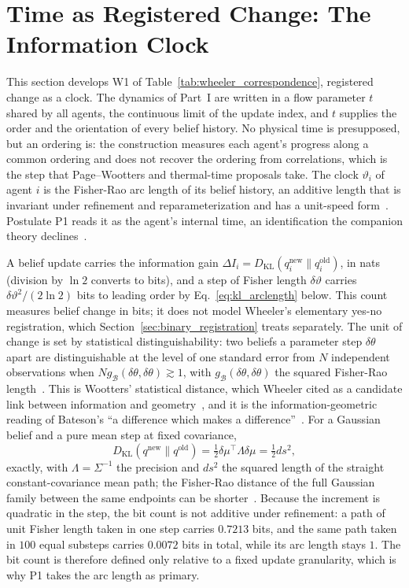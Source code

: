 \documentclass[11pt]{article}
\begin{document}
\section{Time as Registered Change: The Information Clock}\label{sec:time_info}

This section develops W1 of Table~\ref{tab:wheeler_correspondence}, registered change as a clock. The dynamics of Part~I are written in a flow parameter $t$ shared by all agents, the continuous limit of the update index, and $t$ supplies the order and the orientation of every belief history. No physical time is presupposed, but an ordering is: the construction measures each agent's progress along a common ordering and does not recover the ordering from correlations, which is the step that Page--Wootters and thermal-time proposals take. The clock $\vartheta_i$ of agent $i$ is the Fisher-Rao arc length of its belief history, an additive length that is invariant under refinement and reparameterization and has a unit-speed form~\cite[Ch.~7]{DennisGaugeVFE2026}. Postulate P1 reads it as the agent's internal time, an identification the companion theory declines~\cite[Ch.~1]{DennisGaugeVFE2026}.

A belief update carries the information gain $\Delta I_i = D_{\mathrm{KL}}(q_i^{\text{new}} \| q_i^{\text{old}})$, in nats (division by $\ln 2$ converts to bits), and a step of Fisher length $\delta\vartheta$ carries $\delta\vartheta^2/(2\ln 2)$ bits to leading order by Eq.~\eqref{eq:kl_arclength} below. This count measures belief change in bits; it does not model Wheeler's elementary yes-no registration, which Section~\ref{sec:binary_registration} treats separately. The unit of change is set by statistical distinguishability: two beliefs a parameter step $\delta\theta$ apart are distinguishable at the level of one standard error from $N$ independent observations when $N g_{\mathcal{B}}(\delta\theta, \delta\theta) \gtrsim 1$, with $g_{\mathcal{B}}(\delta\theta,\delta\theta)$ the squared Fisher-Rao length~\cite{Wootters1981, BraunsteinCaves1994, AmariNagaoka2000}. This is Wootters' statistical distance, which Wheeler cited as a candidate link between information and geometry~\cite{Wheeler1990}, and it is the information-geometric reading of Bateson's ``a difference which makes a difference''~\cite{Bateson1972}. For a Gaussian belief and a pure mean step at fixed covariance,
\begin{equation}
D_{\mathrm{KL}}(q^{\text{new}} \| q^{\text{old}}) = \tfrac{1}{2}\delta\mu^\top \Lambda \delta\mu = \tfrac{1}{2}ds^2,
\label{eq:kl_arclength}
\end{equation}
exactly, with $\Lambda = \Sigma^{-1}$ the precision and $ds^2$ the squared length of the straight constant-covariance mean path; the Fisher-Rao distance of the full Gaussian family between the same endpoints can be shorter~\cite[Ch.~7]{DennisGaugeVFE2026}. Because the increment is quadratic in the step, the bit count is not additive under refinement: a path of unit Fisher length taken in one step carries $0.7213$ bits, and the same path taken in $100$ equal substeps carries $0.0072$ bits in total, while its arc length stays $1$. The bit count is therefore defined only relative to a fixed update granularity, which is why P1 takes the arc length as primary.
\end{document}
